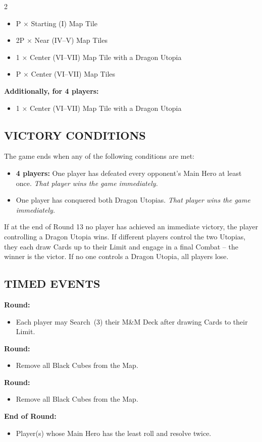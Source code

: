 \begin{multicols*}{2}
\begin{itemize}
  \item P × Starting (I) Map Tile
  \item 2P × Near (IV–V) Map Tiles
  \item 1 × Center (VI–VII) Map Tile with a Dragon Utopia
  \item P × Center (VI–VII) Map Tiles
\end{itemize}

\textbf{Additionally, for 4 players:}
\begin{itemize}
  \item 1 × Center (VI–VII) Map Tile with a Dragon Utopia
\end{itemize}

\subsection*{\MakeUppercase{Victory Conditions}}
The game ends when any of the following conditions are met:

\begin{itemize}
 \item \textbf{4 players:} One player has defeated every opponent's Main Hero at least once. \textit{That player wins the game immediately.}
 \item One player has conquered both Dragon Utopias. \textit{That player wins the game immediately.}
\end{itemize}

If at the end of Round 13 no player has achieved an immediate victory, the player controlling a Dragon Utopia wins.
If different players control the two Utopias, they each draw Cards up to their  Limit and engage in a final Combat -- the winner is the victor.
If no one controls a Dragon Utopia, all players lose.
\subsection*{\MakeUppercase{Timed Events}}

\textbf{ Round:}
\begin{itemize}
  \item Each player may Search~(3) their M\&M Deck after drawing Cards to their  Limit.
\end{itemize}
\textbf{ Round:}
\begin{itemize}
  \item Remove all Black Cubes from the Map.
\end{itemize}
\textbf{ Round:}
\begin{itemize}
  \item Remove all Black Cubes from the Map.
\end{itemize}
\textbf{End of  Round:}
\begin{itemize}
  \item Player(s) whose Main Hero has the least  roll and resolve  twice.
\end{itemize}


\end{multicols*}
